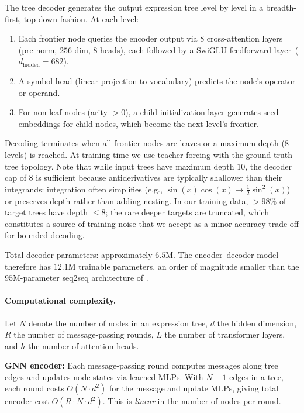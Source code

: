 \documentclass{article}
\begin{document}
The tree decoder generates the output expression tree level by level in a
breadth-first, top-down fashion. At each level:
\begin{enumerate}
	\item Each frontier node queries the encoder output via $8$
	      cross-attention layers (pre-norm, $256$-dim, $8$ heads), each
	      followed by a SwiGLU feedforward
	      layer~($d_{\text{hidden}}\!=\!682$).
	\item A symbol head (linear projection to vocabulary) predicts the
	      node's operator or operand.
	\item For non-leaf nodes (arity $> 0$), a child initialization layer
	      generates seed embeddings for child nodes, which become the next
	      level's frontier.
\end{enumerate}
Decoding terminates when all frontier nodes are leaves or a maximum depth
($8$ levels) is reached. At training time we use teacher forcing with the
ground-truth tree topology. Note that while input trees have maximum depth
$10$, the decoder cap of $8$ is sufficient because antiderivatives are
typically shallower than their integrands: integration often simplifies
(e.g., $\sin(x)\cos(x) \to \frac{1}{2}\sin^2(x)$) or preserves depth
rather than adding nesting. In our training data, $>98\%$ of target trees
have depth $\leq 8$; the rare deeper targets are truncated, which
constitutes a source of training noise that we accept as a minor accuracy
trade-off for bounded decoding.

Total decoder parameters: approximately $6.5$M. The encoder--decoder model
therefore has $12.1$M trainable parameters, an order of magnitude smaller
than the $95$M-parameter seq2seq architecture of
\citet{lample2020deep}.

\paragraph{Computational complexity.}
Let $N$ denote the number of nodes in an expression tree, $d$ the hidden
dimension, $R$ the number of message-passing rounds, $L$ the number of
transformer layers, and $h$ the number of attention heads.

\textbf{GNN encoder:} Each message-passing round computes messages along
tree edges and updates node states via learned MLPs. With $N-1$ edges in
a tree, each round costs $O(N \cdot d^2)$ for the message and update
MLPs, giving total encoder cost $O(R \cdot N \cdot d^2)$. This is
\emph{linear} in the number of nodes per round.
\end{document}
